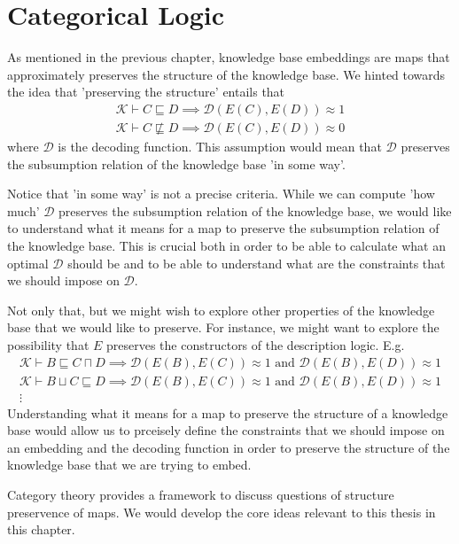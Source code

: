 %
\chapter*{\thechapter \quad Categorical Logic}
As mentioned in the previous chapter,
knowledge base embeddings are maps that approximately preserves the structure of the knowledge base.
We hinted towards the idea that 'preserving the structure' entails
that
\begin{gather*}
    \mathcal{K}\vdash C\sqsubseteq D \implies \mathcal{D}(E(C),E(D))\approx 1\\
    \mathcal{K}\vdash C\not\sqsubseteq D \implies \mathcal{D}(E(C),E(D))\approx 0
\end{gather*}
where $\mathcal{D}$ is the decoding function.
This assumption would mean that $\mathcal{D}$ preserves the subsumption relation of the knowledge base
'in some way'.

Notice that 'in some way' is not a precise criteria. While we can compute 'how much' 
$\mathcal{D}$ preserves the subsumption relation of the knowledge base,
we would like to understand what it means for a map to preserve the subsumption relation of the knowledge base.
This is crucial both in order to be able to calculate what an optimal $\mathcal{D}$
should be and to be able to understand what are the constraints that we should impose on $\mathcal{D}$.

Not only that, but we might wish to explore other properties of the knowledge base that we would like to preserve.
For instance, we might want to explore the possibility that $E$
preserves the constructors of the description logic. E.g.
\begin{gather*}
    \mathcal{K}\vdash B\sqsubseteq C\sqcap D \implies \mathcal{D}(E(B),E(C))\approx 1\text{ and } \mathcal{D}(E(B),E(D))\approx 1
    \\
    \mathcal{K}\vdash B\sqcup C\sqsubseteq D \implies \mathcal{D}(E(B),E(C))\approx 1\text{ and } \mathcal{D}(E(B),E(D))\approx 1
    \\
    \vdots
\end{gather*}
Understanding what it means for a map to preserve the structure of a knowledge base
would allow us to prceisely define the constraints that we should impose on 
an embedding and the decoding function in order to preserve the structure of the knowledge base
that we are trying to embed.

Category theory provides a framework to discuss questions of structure preservence of maps.
We would develop the core ideas relevant to this thesis in this chapter.

